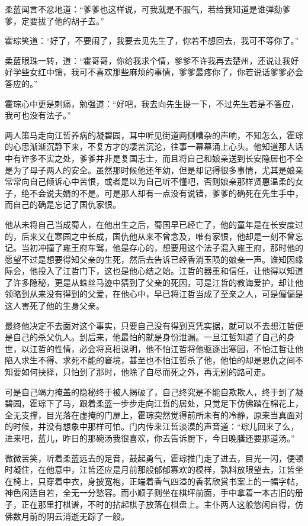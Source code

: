 柔蓝闻言不忿地道：“爹爹也这样说，可我就是不服气，若给我知道是谁弹劾爹爹，定要拔了他的胡子去。”

霍琮笑道：“好了，不要闹了，我要去见先生了，你若不想回去，我可不等你了。”

柔蓝眼珠一转，道：“霍哥哥，你给我求个情，爹爹不许我再去楚州，还说让我好好学些女红中馈，我可不喜欢那些麻烦的事情，爹爹最疼你了，你若说话爹爹必会答应的。”

霍琮心中更是刺痛，勉强道：“好吧，我去向先生提一下，不过先生若是不答应，我可也没有法子。”

两人策马走向江哲养病的凝碧园，耳中听见街道两侧嘈杂的声响，不知怎么，霍琮的心思渐渐沉静下来，不复方才的凄苦沉沦，往事一幕幕涌上心头。他知道那人话中有许多不实之处，爹爹并非是复国志士，而且将自己和娘亲送到长安隐居也不全是为了母子两人的安全。虽然那时候他还年幼，但是却记得很多事情，尤其是娘亲常常向自己倾诉心中苦恨，或者是以为自己听不懂吧，否则娘亲那样贤惠温柔的女子，绝不会说夫婿的不是。可是那人却有一点没有说错，爹爹的确死在先生手中，而自己的确是忘记了国仇家恨。

他从未将自己当成蜀人，在他出生之后，蜀国早已经亡了，他的童年是在长安度过的，后来又在寒园之中长成，国仇他从来不曾念及，唯有家恨，他却是一刻不曾忘记。当初冲撞了雍王府车驾，他是存心的，想要用这个法子混入雍王府，那时他的愿望不过是想要得知父亲的生死，然后去告诉已经香消玉陨的娘亲一声。谁知因缘际会，他投入了江哲门下，这也是他心结之始。江哲的器重和信任，让他得以知道了许多隐秘，更是从蛛丝马迹中猜到了父亲的死因，可是江哲的教诲爱护，却让他领略到从来没有得到的父爱，在他心中，早已将江哲当成了至亲之人，可是偏偏是这人害死了他的生身父亲。

最终他决定不去面对这个事实，只要自己没有得到真凭实据，就可以不去想江哲便是自己的杀父仇人。到后来，他最怕的就是身份泄漏。一旦江哲知道了自己的身世，以江哲的性情，必会将真相说明，他不怕江哲将他驱逐出寒园，不怕江哲让他陷入求生不得、求死不能的窘境，甚至也不怕江哲杀了他，他怕的却是恩仇之间不知要如何抉择，只怕到了那时，他除了自尽而死之外，再无别的路可走。

可是自己竭力掩盖的隐秘终于被人揭破了，自己终究是不能自欺欺人，终于到了凝碧园，霍琮下了马，跟着柔蓝一步步走向江哲的居处，只觉足下仿佛踏在棉花上，全无支撑，目光落在虚掩的门扉上，霍琮突然觉得前所未有的冷静，原来当真面对的时候，并没有想象中那样可怕。门内传来江哲淡漠的声音道：“琮儿回来了么，进来吧，蓝儿，昨日的那碗汤我很喜欢，你去告诉厨下，今日晚膳还要那道汤。”

微微苦笑，听着柔蓝远去的足音，鼓起勇气，霍琮推门走了进去，目光一闪，便顿时凝住，在他意中，江哲还应是月前那般郁郁寡欢的模样，孰料放眼望去，江哲坐在椅上，只穿着中衣，身披宽袍，正端着香气四溢的香茗欣赏书案上的一幅字帖，神色闲适自若，全无一分愁容。而小顺子则坐在棋坪前面，手中拿着一本古旧的册子，正在那里打棋谱，不时的拈起棋子放落在棋盘上。主仆两人这般悠闲自得，仿佛数月前的阴云消逝无踪了一般。

